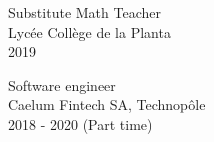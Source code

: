   \vspace{4mm}
  \color{deepgray}
  \large Substitute Math Teacher \\
  \color{mediumgray} \small
  Lycée Collège de la Planta \\
  2019

  \color{deepgray}
  \large Software engineer \\
  \color{mediumgray} \small
  Caelum Fintech SA, Technopôle \\
  2018 - 2020 (Part time)
  \vspace{4mm}
\fi